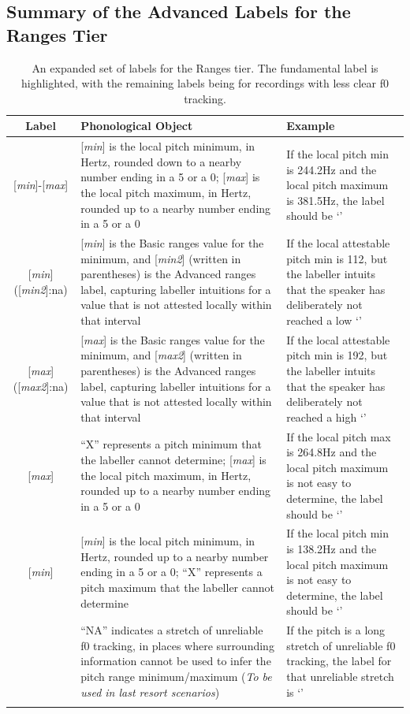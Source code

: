 \documentclass[11pt, twoside]{memoir}
\def\polar#1{{\relsize{-.5}\fontspec[Mapping=tex-text]{Roboto Mono}{#1}}}
\def\polarquot#1{‘\polar{#1}’}
\begin{document}
\subsection{Summary of the Advanced Labels for the Ranges Tier}\label{sec:summary-advanced-ranges-labels}
\begin{longtable}{cp{.46\linewidth}p{.32\linewidth}} \toprule \textbf{Label} & \textbf{Phonological Object} & \textbf{Example}\tabularnewline
\midrule \endhead
\rowcolor{green}
{[\textit{min}]-[\textit{max}]} &
	{[\textit{min}] is the local pitch minimum, in Hertz, rounded down to a nearby number ending in a 5 or a 0}; {[\textit{max}] is the local pitch maximum, in Hertz, rounded up to a nearby number ending in a 5 or a 0} &
	If the local pitch min is 244.2Hz and the local pitch maximum is 381.5Hz, the label should be \polarquot{240-385}
	\tabularnewline
{[\textit{min}]([\textit{min2}]:na)} &
	[\textit{min}] is the Basic ranges value for the minimum, and [\textit{min2}] (written in parentheses) is the Advanced ranges label, capturing labeller intuitions for a value that is not attested locally within that interval &
	If the local attestable pitch min is 112, but the labeller intuits that the speaker has deliberately not reached a low \polarquot{110(90:na)-385}
	\tabularnewline
{[\textit{max}]([\textit{max2}]:na)} &
	[\textit{max}] is the Basic ranges value for the minimum, and [\textit{max2}] (written in parentheses) is the Advanced ranges label, capturing labeller intuitions for a value that is not attested locally within that interval &
	If the local attestable pitch min is 192, but the labeller intuits that the speaker has deliberately not reached a high \polarquot{90-192(300:na)}
	\tabularnewline
{\polar{X-}[\textit{max}]} &
	{“X” represents a pitch minimum that the labeller cannot determine}; {[\textit{max}] is the local pitch maximum, in Hertz, rounded up to a nearby number ending in a 5 or a 0}	 &
	If the local pitch max is 264.8Hz and the local pitch maximum is not easy to determine, the label should be \polarquot{X-270}
	\tabularnewline
{[\textit{min}]\polar{-X}} &
	{[\textit{min}] is the local pitch minimum, in Hertz, rounded up to a nearby number ending in a 5 or a 0}; {“X” represents a pitch maximum that the labeller cannot determine}	 &
	If the local pitch min is 138.2Hz and the local pitch maximum is not easy to determine, the label should be \polarquot{135-X}
	\tabularnewline
\polar{NA} &
	“NA” indicates a stretch of unreliable f0 tracking, in places where surrounding information cannot be used to infer the pitch range minimum\slash maximum (\textit{To be used in last resort scenarios}) &
	If the pitch is a long stretch of unreliable f0 tracking, the label for that unreliable stretch is \polarquot{NA}
	\tabularnewline
\bottomrule 
\caption[An expanded set of labels for the Ranges tier.]{An expanded set of labels for the Ranges tier. The fundamental label is highlighted, with the remaining labels being for recordings with less clear f0 tracking.}
\end{longtable}
\end{document}
